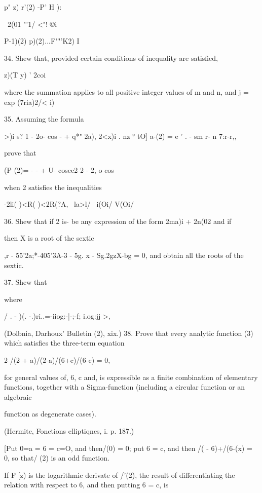 {{p" z) r'(2) -P' H ):

\ 2(01 "'1/ <"! ©i

P-1)(2) p)(2)...F""'K2) I


34. Shew that, provided certain conditions of inequality are
satisfied,

  z)(T y) ' 2coi

where the summation applies to all positive integer values of m and n,
and j = exp (7ria)2/< i)


35. Assuming the formula

>)i s? 1 - 2o- cos - + q*" 2a), 2<x)i . nz ° tO] a-(2) = e ' . - sm
r- n 7:r-r,,

prove that

(P (2)= - - + U- cosec2 2 - 2, o cos

when 2 satisfies the inequalities

-2li( )<R( )<2R(?A, \ la>l/ \ i(Oi/ V(Oi/


%
%

36. Shew that if 2 is- be any expression of the form 2ma)i + 2n(02 and
if

then X is a root of the sextic

,r - 55'2a;*-405'3A-3 - 5g. x - Sg.2gzX-bg = 0, and obtain all the
roots of the sextic. 

37. Shew that

where

/ . - )(. -.)ri..=-iiog:-|-;-f; i.og:jj >,

(Dolbnia, Darhoux' Bulletin (2), xix.) 38. Prove that every analytic
function (3) which satisfies the three-term equation

2 /(2 + a)/(2-a)/(6+c)/(6-c) = 0,

for general values of, 6, c and, is expressible as a finite
combination of elementary functions, together with a Sigma-function
(including a circular function or an algebraic

function as degenerate cases).

(Hermite, Fonctions elliptiqnes, i. p. 187.)

[Put 0=a = 6 = c=O, and then/(0) = 0; put 6 = c, and then /( -
6)+/(6-(x) = 0, so that/ (2) is an odd function.

If F [z) is the logarithmic derivate of /'(2), the result of
differentiating the relation with respect to 6, and then putting 6 =
c, is

}}
